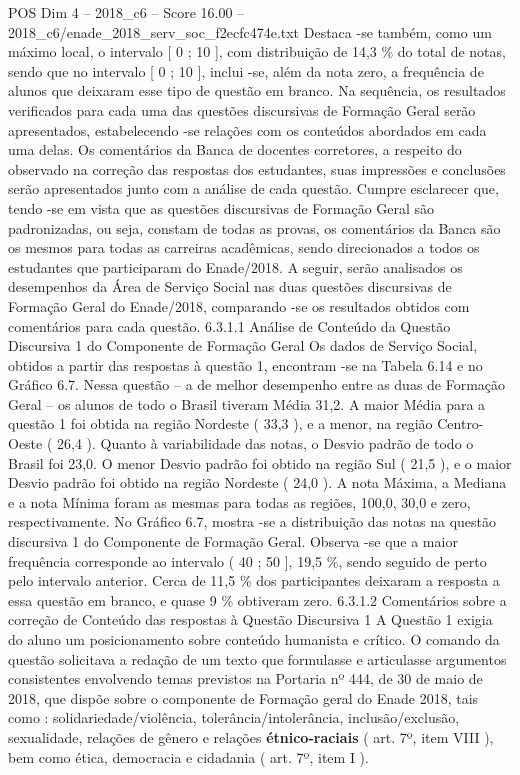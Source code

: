 \begin{textsample}{POS Dim 4 – 2018\_c6 – Score 16.00 – 2018\_c6/enade\_2018\_serv\_soc\_f2ecfc474e.txt}
Destaca -se também, como um máximo local, o intervalo [ 0 ; 10 ], com distribuição de 14,3 \% do total de notas, sendo que no intervalo [ 0 ; 10 ], inclui -se, além da nota zero, a frequência de alunos que deixaram esse tipo de questão em branco.
Na sequência, os resultados verificados para cada uma das questões discursivas de Formação Geral serão apresentados, estabelecendo -se relações com os conteúdos abordados em cada uma delas.
Os comentários da Banca de docentes corretores, a respeito do observado na correção das respostas dos estudantes, suas impressões e conclusões serão apresentados junto com a análise de cada questão.
Cumpre esclarecer que, tendo -se em vista que as questões discursivas de Formação Geral são padronizadas, ou seja, constam de todas as provas, os comentários da Banca são os mesmos para todas as carreiras acadêmicas, sendo direcionados a todos os estudantes que participaram do Enade/2018.
A seguir, serão analisados os desempenhos da Área de Serviço Social nas duas questões discursivas de Formação Geral do Enade/2018, comparando -se os resultados obtidos com comentários para cada questão. 6.3.1.1 Análise de Conteúdo da Questão Discursiva 1 do Componente de Formação Geral Os dados de Serviço Social, obtidos a partir das respostas à questão 1, encontram -se na Tabela 6.14 e no Gráfico 6.7.
Nessa questão – a de melhor desempenho entre as duas de Formação Geral – os alunos de todo o Brasil tiveram Média 31,2.
A maior Média para a questão 1 foi obtida na região Nordeste ( 33,3 ), e a menor, na região Centro-Oeste ( 26,4 ).
Quanto à variabilidade das notas, o Desvio padrão de todo o Brasil foi 23,0.
O menor Desvio padrão foi obtido na região Sul ( 21,5 ), e o maior Desvio padrão foi obtido na região Nordeste ( 24,0 ).
A nota Máxima, a Mediana e a nota Mínima foram as mesmas para todas as regiões, 100,0, 30,0 e zero, respectivamente.
No Gráfico 6.7, mostra -se a distribuição das notas na questão discursiva 1 do Componente de Formação Geral.
Observa -se que a maior frequência corresponde ao intervalo ( 40 ; 50 ], 19,5 \%, sendo seguido de perto pelo intervalo anterior.
Cerca de 11,5 \% dos participantes deixaram a resposta a essa questão em branco, e quase 9 \% obtiveram zero. 6.3.1.2 Comentários sobre a correção de Conteúdo das respostas à Questão Discursiva 1 A Questão 1 exigia do aluno um posicionamento sobre conteúdo humanista e crítico.
O comando da questão solicitava a redação de um texto que formulasse e articulasse argumentos consistentes envolvendo temas previstos na Portaria nº 444, de 30 de maio de 2018, que dispõe sobre o componente de Formação geral do Enade 2018, tais como : solidariedade/violência, tolerância/intolerância, inclusão/exclusão, sexualidade, relações de gênero e relações \textbf{étnico-raciais} ( art. 7º, item VIII ), bem como ética, democracia e cidadania ( art. 7º, item I ).

\end{textsample}
